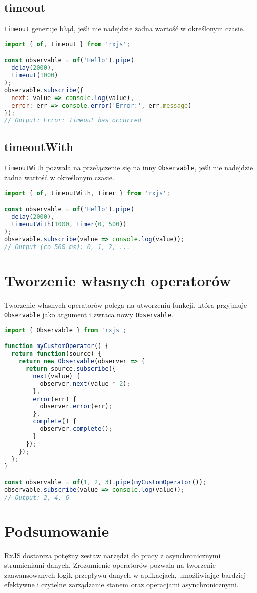 \documentclass[a4paper,12pt]{article}
\begin{document}
\subsection{timeout}
\texttt{timeout} generuje błąd, jeśli nie nadejdzie żadna wartość w określonym czasie.

\begin{lstlisting}[language=JavaScript, caption=Przykład użycia \texttt{timeout}]
import { of, timeout } from 'rxjs';

const observable = of('Hello').pipe(
  delay(2000),
  timeout(1000)
);
observable.subscribe({
  next: value => console.log(value),
  error: err => console.error('Error:', err.message)
});
// Output: Error: Timeout has occurred
\end{lstlisting}

\subsection{timeoutWith}
\texttt{timeoutWith} pozwala na przełączenie się na inny \texttt{Observable}, jeśli nie nadejdzie żadna wartość w określonym czasie.

\begin{lstlisting}[language=JavaScript, caption=Przykład użycia \texttt{timeoutWith}]
import { of, timeoutWith, timer } from 'rxjs';

const observable = of('Hello').pipe(
  delay(2000),
  timeoutWith(1000, timer(0, 500))
);
observable.subscribe(value => console.log(value));
// Output (co 500 ms): 0, 1, 2, ...
\end{lstlisting}

\section{Tworzenie własnych operatorów}
Tworzenie własnych operatorów polega na utworzeniu funkcji, która przyjmuje \texttt{Observable} jako argument i zwraca nowy \texttt{Observable}.

\begin{lstlisting}[language=JavaScript, caption=Przykład tworzenia własnego operatora]
import { Observable } from 'rxjs';

function myCustomOperator() {
  return function(source) {
    return new Observable(observer => {
      return source.subscribe({
        next(value) {
          observer.next(value * 2);
        },
        error(err) {
          observer.error(err);
        },
        complete() {
          observer.complete();
        }
      });
    });
  };
}

const observable = of(1, 2, 3).pipe(myCustomOperator());
observable.subscribe(value => console.log(value));
// Output: 2, 4, 6
\end{lstlisting}

\section{Podsumowanie}
RxJS dostarcza potężny zestaw narzędzi do pracy z asynchronicznymi strumieniami danych. Zrozumienie operatorów pozwala na tworzenie zaawansowanych logik przepływu danych w aplikacjach, umożliwiając bardziej efektywne i czytelne zarządzanie stanem oraz operacjami asynchronicznymi.
\end{document}
